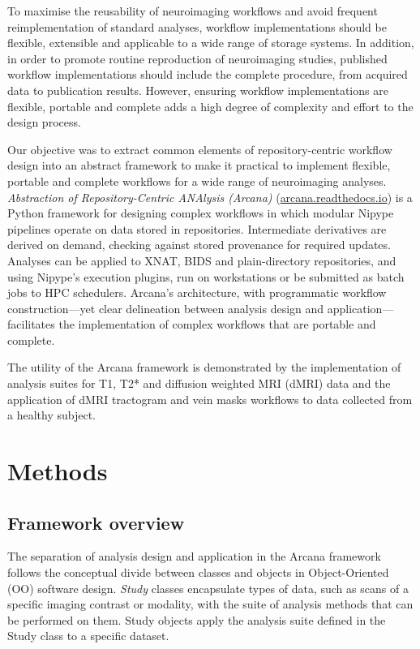 \documentclass[smallextended]{svjour3}       %
\begin{document}
To maximise the reusability of neuroimaging workflows and avoid frequent
reimplementation of standard analyses, workflow implementations should
be flexible, extensible and applicable to a wide range of storage
systems. In addition, in order to promote routine reproduction of
neuroimaging studies, published workflow implementations should include
the complete procedure, from acquired data to publication results.
However, ensuring workflow implementations are flexible, portable and
complete adds a high degree of complexity and effort to the design
process.

Our objective was to extract common elements of repository-centric
workflow design into an abstract framework to make it practical to
implement flexible, portable and complete workflows for a wide range of
neuroimaging analyses. \emph{Abstraction of Repository-Centric ANAlysis
(Arcana)} (\url{arcana.readthedocs.io}) is a Python framework for
designing complex workflows in which modular Nipype pipelines operate on
data stored in repositories. Intermediate derivatives are
derived on demand, checking against stored provenance for required
updates. Analyses can be applied to XNAT, BIDS and plain-directory
repositories, and using Nipype's execution plugins, run on workstations
or be submitted as batch jobs to HPC schedulers. Arcana's architecture,
with programmatic workflow construction---yet clear delineation between
analysis design and application---facilitates the implementation of
complex workflows that are portable and complete.


The utility of the Arcana framework is demonstrated by the
implementation of analysis suites for T1, T2* and diffusion weighted MRI
(dMRI) data and the application of dMRI tractogram \citep{tournier_mrtrix:_2012} and
vein masks \citep{ward_vein_2017} workflows to data collected from a
healthy subject.

\section*{Methods}
\label{methods}

\subsection*{Framework overview}
\label{framework-overview}

The separation of analysis design and application in the Arcana
framework follows the conceptual divide between classes and objects in
Object-Oriented (OO) software design. \emph{Study} classes encapsulate
types of data, such as scans of a specific imaging
contrast or modality, with the suite of analysis methods that can be performed on
them. Study objects apply the analysis suite defined in
the Study class to a specific dataset.
\end{document}
